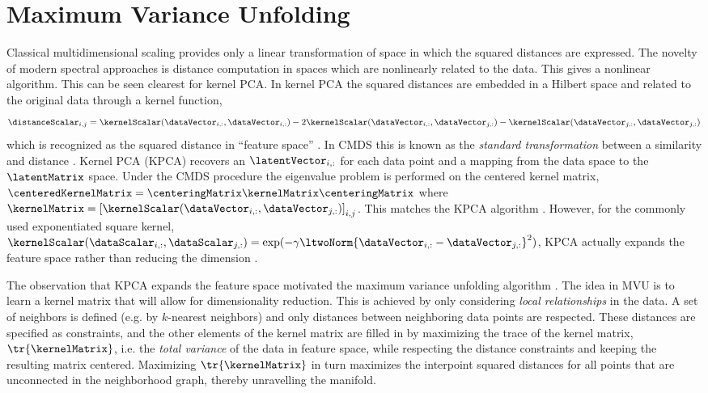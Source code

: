 \section{Maximum Variance Unfolding}

Classical multidimensional scaling provides only a linear
transformation of space in which the squared distances are
expressed. The novelty of modern spectral approaches is distance computation in spaces which are nonlinearly
related to the data. This gives a nonlinear
algorithm. This can be seen clearest for kernel PCA. In kernel PCA the
squared distances are embedded in a Hilbert space and related to the original
data through a kernel function,
\begin{equation}
  \distanceScalar_{i,j}
  = \kernelScalar(\dataVector_{i, :}, \dataVector_{i,:}) -
  2\kernelScalar(\dataVector_{i, :}, \dataVector_{j, :}) -
  \kernelScalar(\dataVector_{j,:}, \dataVector_{j, :})
  \label{eq:standardTransformation}
\end{equation}
which is recognized as the squared distance in ``feature space''
\citep[see][]{Ham:kernelDimred04}. In CMDS this is known as the
\emph{standard transformation} between a similarity and distance
\citep{Mardia:multivariate79}. Kernel PCA (KPCA) recovers an
$\latentVector_{i, :}$ for each data point and a mapping from the data
space to the $\latentMatrix$ space. Under the CMDS procedure the
eigenvalue problem is performed on the centered kernel matrix,
$\centeredKernelMatrix=\centeringMatrix\kernelMatrix\centeringMatrix$
where $\kernelMatrix = \left[\kernelScalar(\dataVector_{i, :},
  \dataVector_{j, :})\right]_{i,j}$. This matches the KPCA
 algorithm \citep{Scholkopf:nonlinear98}. However, for the commonly
used exponentiated square kernel, $\kernelScalar(\dataScalar_{i, :},
\dataScalar_{j, :}) = \exp(-\gamma \ltwoNorm{\dataVector_{i, :} -
  \dataVector_{j, :}}^2)$, KPCA actually expands the feature
space rather than reducing the dimension \citep[see][for some examples
of this]{Weinberger:learning04}.

The observation that KPCA expands the feature space motivated the
maximum variance unfolding algorithm
\citep{Weinberger:learning04}. The idea in MVU is to learn a kernel
matrix that will allow for dimensionality reduction. This is achieved
by only considering \emph{local relationships} in the data. A set of
neighbors is defined (e.g. by $k$-nearest neighbors) and only
distances between neighboring data points are respected. These
distances are specified as constraints, and the other elements of the
kernel matrix are filled in by maximizing the trace of the kernel
matrix, $\tr{\kernelMatrix}$, i.e. the \emph{total variance} of the
data in feature space, while respecting the distance constraints and
keeping the resulting matrix centered. Maximizing $\tr{\kernelMatrix}$
in turn maximizes the interpoint squared distances for all points that are
unconnected in the neighborhood graph, thereby unravelling the
manifold.

